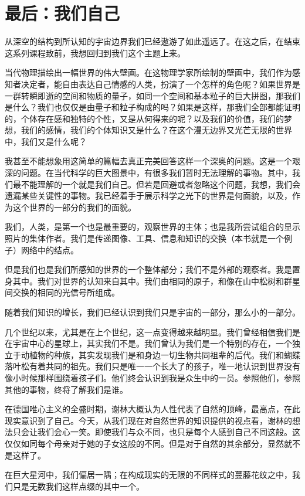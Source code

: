 	\chapter{最后：我们自己}
\indent

   从深空的结构到所认知的宇宙边界我们已经遨游了如此遥远了。在这之后，在结束这系列课程致前，我想回归到我们这个主题上来。

   当代物理描绘出一幅世界的伟大壁画。在这物理学家所绘制的壁画中，我们作为感知者决定者，能自由表达自己情感的人类，扮演了一个怎样的角色呢？如果世界是一群转瞬即逝的空间和物质的量子，如同一个空间和基本粒子的巨大拼图，那我们是什么？我们也仅仅是由量子和粒子构成的吗？如果是这样，那我们全部都能证明的，个体存在感和独特的个性，又是从何得来的呢？以及我们的价值，我们的梦想，我们的感情，我们的个体知识又是什么？在这个漫无边界又光芒无限的世界中，我们又是什么呢？

   我甚至不能想象用这简单的篇幅去真正完美回答这样一个深奥的问题。这是一个艰深的问题。在当代科学的巨大图景中，有很多我们暂时无法理解的事物。其中，我们最不能理解的一个就是我们自己。但若是回避或者忽略这个问题，我想，我们会遗漏某些关键性的事物。我已经着手于展示科学之光下的世界是何面貌，以及，作为这个世界的一部分的我们的面貌。

   我们，人类，是第一个也是最重要的，观察世界的主体；也是我所尝试组合的显示照片的集体作者。我们是传递图像、工具、信息和知识的交换（本书就是一个例子）网络中的结点。

   但是我们也是我们所感知的世界的一个整体部分；我们不是外部的观察者。我是置身其中。我们对世界的认知来自其中。我们由相同的原子，和像在山中松树和群星间交换的相同的光信号所组成。

   随着我们知识的增长，我们已经认识到我们只是宇宙的一部分，那么小的一部分。

   几个世纪以来，尤其是在上个世纪，这一点变得越来越明显。我们曾经相信我们是在宇宙中心的星球上，其实我们不是。我们曾认为我们是一个特别的存在，一个独立于动植物的种族，其实发现我们是和身边一切生物共同祖辈的后代。我们和蝴蝶落叶松有着共同的祖先。我们只是唯一一个长大了的孩子，唯一地认识到世界没有像小时候那样围绕着孩子们。他们终会认识到我是众生中的一员。参照他们，参照其他的事物，终将了解我们是谁。

   在德国唯心主义的全盛时期，谢林大概认为人性代表了自然的顶峰，最高点，在此现实意识到了自己。今天，从我们现在对自然世界的知识提供的视点看，谢林的想法只会让我们会心一笑。即使我们与众不同，也只是每个人感到自己不同这般。这仅仅如同每个母亲对于她的子女这般的不同。但是对于自然的其余部分，显然就不是这样了。

   在巨大星河中，我们偏居一隅；在构成现实的无限的不同样式的蔓藤花纹之中，我们只是无数我们这样点缀的其中一个。

